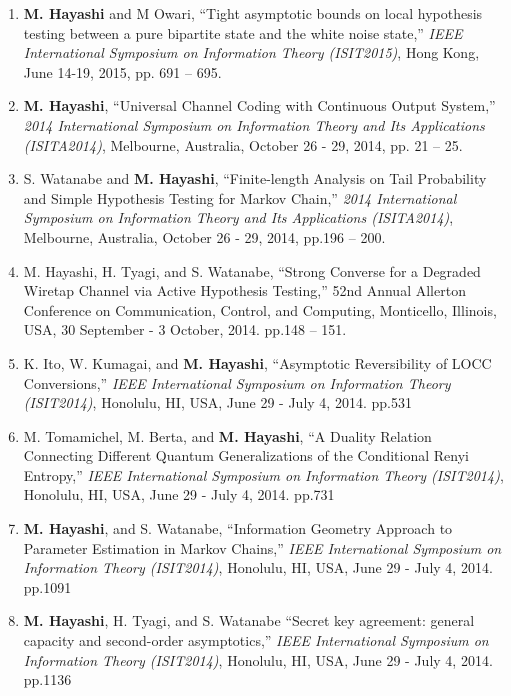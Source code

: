 \documentclass[a4paper,12pt,oneside]{article}
\begin{document}
\begin{enumerate}
\item 
\textbf{M. Hayashi} and M Owari, 
``Tight asymptotic bounds on local hypothesis testing between a pure bipartite state and the white noise state,'' 
{\em IEEE International Symposium on Information Theory (ISIT2015)},
Hong Kong, June 14-19, 2015, pp. 691 -- 695.

\item 
\textbf{M. Hayashi},
``Universal Channel Coding with Continuous Output System,'' 
{\em 2014 International Symposium on Information Theory and Its Applications (ISITA2014)}, Melbourne, Australia, October 26 - 29, 2014, pp. 21 -- 25.

\item 
S. Watanabe and \textbf{M. Hayashi},
``Finite-length Analysis on Tail Probability and Simple Hypothesis Testing for Markov Chain,'' 
{\em 2014 International Symposium on Information Theory and Its Applications (ISITA2014)}, Melbourne, Australia, October 26 - 29, 2014, pp.196 -- 200.

\item 
M. Hayashi, H. Tyagi, and S. Watanabe, ``Strong Converse for a Degraded Wiretap Channel via Active Hypothesis Testing,'' 52nd Annual Allerton Conference on Communication, Control, and Computing, Monticello, Illinois, USA, 30 September - 3 October, 2014. pp.148 -- 151.

\item 
K. Ito, W. Kumagai, and \textbf{M. Hayashi}, 
``Asymptotic Reversibility of LOCC Conversions,'' 
{\em IEEE International Symposium on Information Theory (ISIT2014)}, Honolulu, HI, USA, June 29 - July 4, 
2014. pp.531

\item 
M. Tomamichel, M. Berta, and \textbf{M. Hayashi}, 
``A Duality Relation Connecting Different Quantum Generalizations of the Conditional Renyi Entropy,'' 
{\em IEEE International Symposium on Information Theory (ISIT2014)}, 
Honolulu, HI, USA, June 29 - July 4, 2014. pp.731

\item 
\textbf{M. Hayashi}, and S. Watanabe, 
``Information Geometry Approach to Parameter Estimation in Markov Chains,'' {\em IEEE International Symposium on Information Theory (ISIT2014)}, Honolulu, HI, USA, June 29 - July 4, 2014. pp.1091

\item 
\textbf{M. Hayashi}, H. Tyagi, and S. Watanabe 
``Secret key agreement: general capacity and second-order asymptotics,'' 
{\em IEEE International Symposium on Information Theory (ISIT2014)}, Honolulu, HI, USA, June 29 - July 4, 2014. pp.1136


\end{enumerate}
\end{document}
